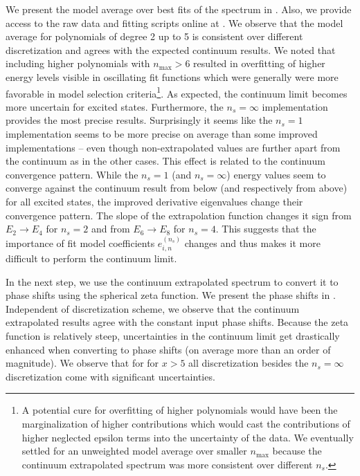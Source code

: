 We present the model average over best fits of the spectrum in .
Also, we provide access to the raw data and fitting scripts online at \cite{repo}.
We observe that the model average for polynomials of degree 2 up to 5 is consistent over different discretization and agrees with the expected continuum results.
We noted that including higher polynomials with $n_\mathrm{max} > 6$ resulted in overfitting of higher energy levels visible in oscillating fit functions which were generally were more favorable in model selection criteria\footnote{
    A potential cure for overfitting of higher polynomials would have been the marginalization of higher contributions which would cast the contributions of higher neglected epsilon terms into the uncertainty of the data.
    We eventually settled for an unweighted model average over smaller $n_\mathrm{max}$ because the continuum extrapolated spectrum was more consistent over different $n_s$.
}.
As expected, the continuum limit becomes more uncertain for excited states.
Furthermore, the $n_s = \infty$ implementation provides the most precise results.
Surprisingly it seems like the $n_s = 1$ implementation seems to be more precise on average than some improved implementations -- even though non-extrapolated values are further apart from the continuum as in the other cases.
This effect is related to the continuum convergence pattern.
While the $n_s = 1$ (and $n_s = \infty$) energy values seem to converge against the continuum result from below (and respectively from above) for all excited states, the improved derivative eigenvalues change their convergence pattern.
The slope of the extrapolation function changes it sign from $E_2 \to E_4$ for $n_s = 2$ and from $E_6 \to E_8$ for  $n_s = 4$.
This suggests that the importance of fit model coefficients $e_{i,n}^{(n_s)}$ changes and thus makes it more difficult to perform the continuum limit.

In the next step, we use the continuum extrapolated spectrum to convert it to phase shifts using the spherical zeta function.
We present the phase shifts in .
Independent of discretization scheme, we observe that the continuum extrapolated results agree with the constant input phase shifts.
Because the zeta function is relatively steep, uncertainties in the continuum limit get drastically enhanced when converting to phase shifts (on average more than an order of magnitude).
We observe that for for $x > 5$ all discretization besides the $n_s = \infty$ discretization come with significant uncertainties.


